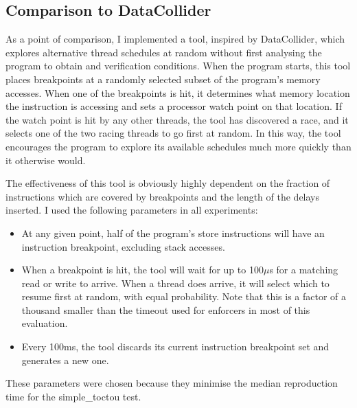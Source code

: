 \subsection{Comparison to DataCollider}
\label{sect:eval:datacollider}

As a point of comparison, I implemented a tool, inspired by
DataCollider\cite{Erickson2010}, which explores alternative thread
schedules at random without first analysing the program to obtain
{\StateMachines} and verification conditions.  When the program
starts, this tool places breakpoints at a randomly selected subset of
the program's memory accesses.  When one of the breakpoints is hit, it
determines what memory location the instruction is accessing and sets
a processor watch point\needCite{} on that location.  If the watch
point is hit by any other threads, the tool has discovered a race, and
it selects one of the two racing threads to go first at random.  In
this way, the tool encourages the program to explore its available
schedules much more quickly than it otherwise would.

The effectiveness of this tool is obviously highly dependent on the
fraction of instructions which are covered by breakpoints and the
length of the delays inserted.  I used the following parameters in all
experiments:

\begin{itemize}
\item
  At any given point, half of the program's store instructions will
  have an instruction breakpoint, excluding stack accesses.
\item
  When a breakpoint is hit, the tool will wait for up to 100$\mu$s for
  a matching read or write to arrive.  When a thread does arrive, it
  will select which to resume first at random, with equal probability.
  Note that this is a factor of a thousand smaller than the timeout
  used for {\technique} enforcers in most of this evaluation.
\item
  Every 100ms, the tool discards its current instruction breakpoint
  set and generates a new one.
\end{itemize}

These parameters were chosen because they minimise the median
reproduction time for the simple\_toctou test.

